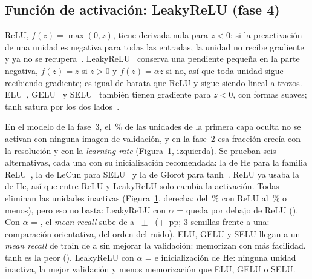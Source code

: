 \subsection{Función de activación: LeakyReLU (fase 4)}
ReLU, $f(z) = \max(0, z)$, tiene derivada nula para $z < 0$: si la preactivación de una unidad es negativa para todas
las entradas, la unidad no recibe gradiente y ya no se recupera~\cite{goodfellow}. LeakyReLU~\cite{maas} conserva una
pendiente pequeña en la parte negativa, $f(z) = z$ si $z > 0$ y $f(z) = \alpha z$ si no, así que toda unidad sigue
recibiendo gradiente; es igual de barata que ReLU y sigue siendo lineal a trozos. ELU~\cite{clevert}, GELU~\cite{gelu}
y SELU~\cite{selu} también tienen gradiente para $z < 0$, con formas suaves; tanh satura por los dos lados~\cite{glorot}.

{En el modelo de la fase~3, el \,\% de las unidades de la primera capa oculta no se activan con
ninguna imagen de validación, y en la fase~2 esa fracción crecía con la resolución y con la \emph{learning rate}
(Figura~\ref{fig:activation}, izquierda).}
{Se prueban seis alternativas, cada una con su inicialización recomendada: la de He para la familia ReLU~\cite{he},
la de LeCun para SELU~\cite{selu} y la de Glorot para tanh~\cite{glorot}. ReLU ya usaba la de He, así que entre ReLU y
LeakyReLU solo cambia la activación. Todas eliminan las unidades inactivas (Figura~\ref{fig:activation}, derecha: del
\,\% con ReLU al \,\% o menos), pero eso no basta: LeakyReLU con $\alpha$ =
 queda por debajo de ReLU (). Con $\alpha$ = ,
el \emph{mean recall} sube de  a ~$\pm$~
(+~pp; 3 semillas frente a una: comparación orientativa, del orden del ruido). ELU, GELU y SELU
llegan a un \emph{mean recall} de train de  a  sin mejorar la
validación: memorizan con más facilidad. tanh es la peor ().}
{LeakyReLU con $\alpha$ =  e inicialización de He: ninguna unidad inactiva, la mejor validación
y menos memorización que ELU, GELU o SELU.}

\begin{figure}[!htbp]
  \centering
  \caption{}
  \label{fig:activation}
\end{figure}

